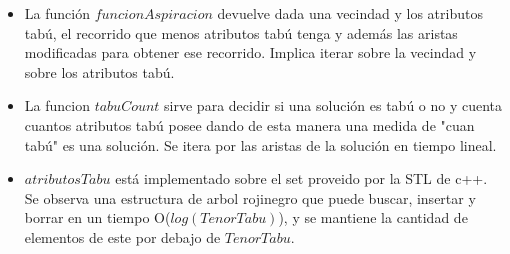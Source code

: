 \begin{itemize}
\item La función $funcionAspiracion$ devuelve dada una vecindad y los atributos tabú, el recorrido que menos atributos tabú tenga y además las aristas modificadas para obtener ese recorrido. Implica iterar sobre la vecindad y sobre los atributos tabú. 
\item La funcion $tabuCount$ sirve para decidir si una solución es tabú o no y cuenta cuantos atributos tabú posee dando de esta manera una medida de "cuan tabú" es una solución. Se itera por las aristas de la solución en tiempo lineal.
\item $atributosTabu$ está implementado sobre el set proveido por la STL de c++. Se observa una estructura de arbol rojinegro que puede buscar, insertar y borrar en un tiempo O($log(TenorTabu)$), y se mantiene la cantidad de elementos de este por debajo de $TenorTabu$.
\end{itemize}
